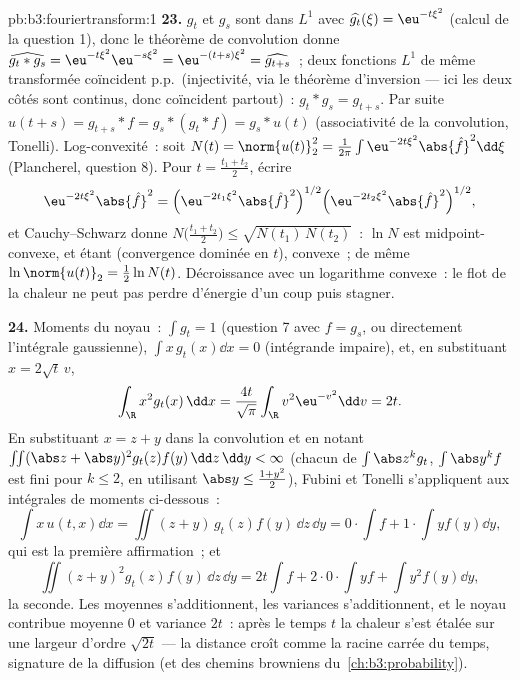\begin{solution}{pb:b3:fouriertransform:1}
\textbf{23.} $g_t$ et $g_s$ sont dans $L^1$ avec
$\widehat{g_t}(\xi) = \eu^{-t\xi^2}$ (calcul de la question
1), donc le théorème de convolution donne $\widehat{g_t *
g_s} = \eu^{-t\xi^2}\eu^{-s\xi^2} = \eu^{-(t+s)\xi^2} =
\widehat{g_{t+s}}$~; deux fonctions $L^1$ de même
transformée coïncident p.p.\ (injectivité, via le théorème
d'inversion --- ici les deux côtés sont continus, donc
coïncident partout)~: $g_t * g_s = g_{t+s}$. Par suite $u(t
+ s) = g_{t+s} * f = g_s * (g_t * f) = g_s * u(t)$
(associativité de la convolution, Tonelli). Log-convexité~:
soit $N(t) = \norm{u(t)}_2^2 = \frac1{2\pi}\int
\eu^{-2t\xi^2}\abs{\hat f}^2\dd\xi$ (Plancherel, question
8). Pour $t = \frac{t_1 + t_2}2$, écrire
\[
\eu^{-2t\xi^2}\abs{\hat f}^2
= \Bigl(\eu^{-2t_1\xi^2}\abs{\hat f}^2\Bigr)^{1/2}
\Bigl(\eu^{-2t_2\xi^2}\abs{\hat f}^2\Bigr)^{1/2},
\]
et Cauchy--Schwarz donne $N\bigl(\frac{t_1+t_2}2\bigr) \leq
\sqrt{N(t_1)\,N(t_2)}$~: $\ln N$ est midpoint-convexe, et
étant  (convergence dominée en $t$), convexe~; de
même $\ln\norm{u(t)}_2 = \frac12\ln N(t)$. Décroissance avec
un logarithme convexe~: le flot de la chaleur ne peut pas
perdre d'énergie d'un coup puis stagner.

\textbf{24.} Moments du noyau~: $\int g_t = 1$ (question 7
avec $f = g_s$, ou directement l'intégrale gaussienne),
$\int x\,g_t(x)\dd x = 0$ (intégrande impaire), et, en
substituant $x = 2\sqrt t\,v$,
\[
\int_\R x^2g_t(x)\,\dd x
= \frac{4t}{\sqrt\pi}\int_\R v^2\eu^{-v^2}\dd v = 2t .
\]
En substituant $x = z + y$ dans la convolution et en notant
$\iint(\abs z + \abs y)^2g_t(z)f(y)\,\dd z\,\dd y < \infty$
(chacun de $\int\abs z^kg_t$, $\int\abs y^kf$ est fini pour
$k \leq 2$, en utilisant $\abs y \leq \frac{1 + y^2}2$),
Fubini et Tonelli s'appliquent aux intégrales de moments
ci-dessous~:
\[
\int x\,u(t,x)\dd x = \iint (z + y)\,g_t(z)f(y)\,\dd z\,\dd
y = 0\cdot\!\int\! f + 1\cdot\!\int\! yf(y)\dd y,
\]
qui est la première affirmation~; et
\[
\iint (z+y)^2g_t(z)f(y)\,\dd z\,\dd y
= 2t\int f + 2\cdot0\cdot\!\int\! yf + \int y^2f(y)\dd y ,
\]
la seconde. Les moyennes s'additionnent, les variances
s'additionnent, et le noyau contribue moyenne $0$ et variance
$2t$~: après le temps $t$ la chaleur s'est étalée sur une
largeur d'ordre $\sqrt{2t}$ --- la distance croît comme la
racine carrée du temps, signature de la diffusion (et des
chemins browniens du~\cref{ch:b3:probability}).


\end{solution}
